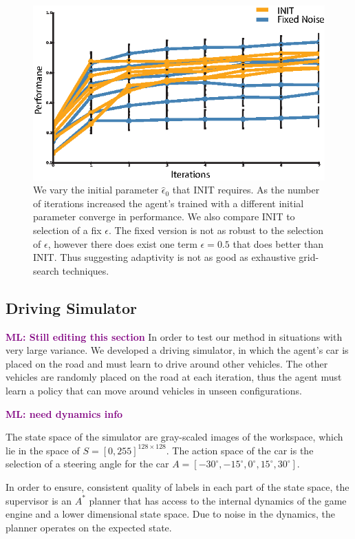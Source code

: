 \documentclass[conference]{article}
\newcommand{\mlnote}[1]{\ifthenelse{ \boolean{include-notes}}%
 {\textcolor{purple}{\textbf{ML: #1}}}{}}
\begin{document}
\begin{figure}
\centering
\includegraphics{f_figs/random_parameter.eps}
\caption{
We vary the initial parameter $\hat{\epsilon}_0$ that INIT requires. As the number of iterations increased the agent's trained with a different initial parameter converge in performance. We also compare INIT to selection of a fix $\epsilon$. The fixed version is not as robust to the selection of $\epsilon$, however there does exist one term $\epsilon = 0.5$ that does better than INIT. Thus suggesting adaptivity is not as good as exhaustive grid-search techniques. 
    \footnotesize}
\vspace*{-20pt}
\label{fig:r_init}
\end{figure}


\subsection{Driving Simulator}\label{sec:driving}
\mlnote{Still editing this section}
In order to test our method in situations with very large variance. We developed a driving simulator, in which the agent's car is placed on the road and must learn to drive around other vehicles. The other vehicles are randomly placed on the road at each iteration, thus the agent must learn a policy that can move around vehicles in unseen configurations. 

\mlnote{need dynamics info}

The state space of the simulator are  gray-scaled images of the workspace, which lie in the space of $S = [0,255]^{128\times128}$. The action space of the car is the selection of a steering angle for the car $A = [-30^\circ, -15^\circ, 0^\circ, 15^\circ, 30^\circ]$.

In order to ensure, consistent quality of labels in each part of the state space, the supervisor is an $A^*$  planner that has access to the internal dynamics of the game engine and a lower dimensional state space. Due to noise in the dynamics, the planner operates on the expected state. 
\end{document}
